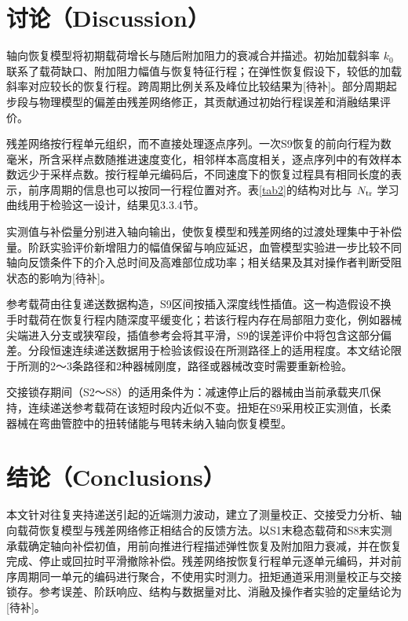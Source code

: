 \documentclass{JQRnew}
\providecommand{\RevisionColor}{\color{black}}
\newcommand{\revbegin}{\begingroup\RevisionColor}
\newcommand{\revend}{\par\endgroup}
\begin{document}
\section{讨论（Discussion）}

\revbegin
轴向恢复模型将初期载荷增长与随后附加阻力的衰减合并描述。初始加载斜率 $k_0$ 联系了载荷缺口、附加阻力幅值与恢复特征行程；在弹性恢复假设下，较低的加载斜率对应较长的恢复行程。跨周期比例关系及峰位比较结果为[待补]。部分周期起步段与物理模型的偏差由残差网络修正，其贡献通过初始行程误差和消融结果评价。
\revend

残差网络按行程单元组织，而不直接处理逐点序列。一次S9恢复的前向行程为数毫米，所含采样点数随推进速度变化，相邻样本高度相关，逐点序列中的有效样本数远少于采样点数。按行程单元编码后，不同速度下的恢复过程具有相同长度的表示，前序周期的信息也可以按同一行程位置对齐。表\ref{tab2}的结构对比与 $N_{\rm tr}$ 学习曲线用于检验这一设计，结果见3.3.4节。

\revbegin
实测值与补偿量分别进入轴向输出，使恢复模型和残差网络的过渡处理集中于补偿量。阶跃实验评价新增阻力的幅值保留与响应延迟，血管模型实验进一步比较不同轴向反馈条件下的介入总时间及高难部位成功率；相关结果及其对操作者判断受阻状态的影响为[待补]。
\revend

参考载荷由往复递送数据构造，S9区间按插入深度线性插值。这一构造假设不换手时载荷在恢复行程内随深度平缓变化；若该行程内存在局部阻力变化，例如器械尖端进入分支或狭窄段，插值参考会将其平滑，S9的误差评价中将包含这部分偏差。分段恒速连续递送数据用于检验该假设在所测路径上的适用程度。本文结论限于所测的2～3条路径和2种器械刚度，路径或器械改变时需要重新检验。

\revbegin
交接锁存期间（S2～S8）的适用条件为：减速停止后的器械由当前承载夹爪保持，连续递送参考载荷在该短时段内近似不变。扭矩在S9采用校正实测值，长柔器械在弯曲管腔中的扭转储能与甩转未纳入轴向恢复模型。
\revend

\section{结论（Conclusions）}

本文针对往复夹持递送引起的近端测力波动，建立了测量校正、交接受力分析、轴向载荷恢复模型与残差网络修正相结合的反馈方法。以S1末稳态载荷和S8末实测承载确定轴向补偿初值，用前向推进行程描述弹性恢复及附加阻力衰减，并在恢复完成、停止或回拉时平滑撤除补偿。残差网络按恢复行程单元逐单元编码，并对前序周期同一单元的编码进行聚合，不使用实时测力。扭矩通道采用测量校正与交接锁存。参考误差、阶跃响应、结构与数据量对比、消融及操作者实验的定量结论为[待补]。
\end{document}
